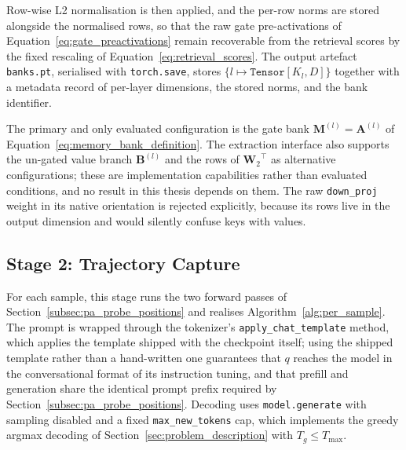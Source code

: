 Row-wise L2 normalisation is then applied, and the per-row norms are stored
alongside the normalised rows, so that the raw gate pre-activations of
Equation~\eqref{eq:gate_preactivations} remain recoverable from the
retrieval scores by the fixed rescaling of
Equation~\eqref{eq:retrieval_scores}. The output artefact
\texttt{banks.pt}, serialised with \texttt{torch.save}, stores
$\{l \mapsto \texttt{Tensor}[K_l, D]\}$ together with a metadata record of
per-layer dimensions, the stored norms, and the bank identifier.

The primary and only evaluated configuration is the gate bank
$\mathbf{M}^{(l)} = \mathbf{A}^{(l)}$ of
Equation~\eqref{eq:memory_bank_definition}. The extraction interface also
supports the un-gated value branch $\mathbf{B}^{(l)}$ and the rows of
${\mathbf{W}_2}^{\!\top}$ as alternative configurations; these are
implementation capabilities rather than evaluated conditions, and no result
in this thesis depends on them. The raw \texttt{down\_proj} weight in its
native orientation is rejected explicitly, because its rows live in the
output dimension and would silently confuse keys with values.

\subsection{Stage 2: Trajectory Capture}
\label{subsec:stage2}

For each sample, this stage runs the two forward passes of
Section~\ref{subsec:pa_probe_positions} and realises
Algorithm~\ref{alg:per_sample}. The prompt is wrapped through the
tokenizer's \texttt{apply\_chat\_template} method, which applies the
template shipped with the checkpoint itself; using the shipped template
rather than a hand-written one guarantees that $q$ reaches the model in the
conversational format of its instruction tuning, and that prefill and
generation share the identical prompt prefix required by
Section~\ref{subsec:pa_probe_positions}. Decoding uses
\texttt{model.generate} with sampling disabled and a fixed
\texttt{max\_new\_tokens} cap, which implements the greedy argmax decoding
of Section~\ref{sec:problem_description} with $T_g \le T_{\max}$.

